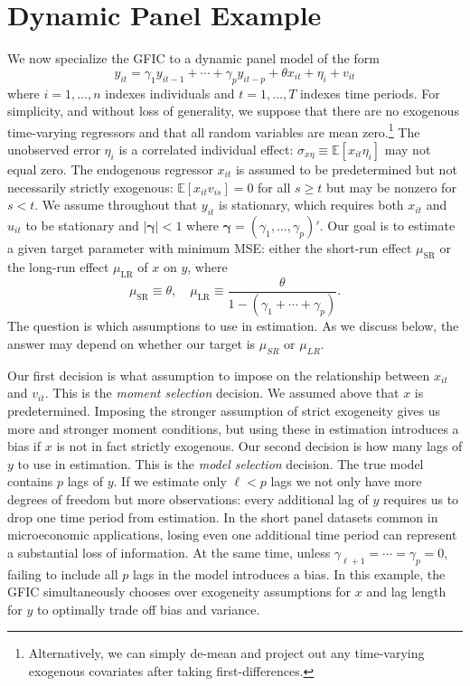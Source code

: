 \section{Dynamic Panel Example}
\label{sec:panel}
We now specialize the GFIC to a dynamic panel model of the form 
\begin{equation}
  y_{it} = \gamma_1 y_{it-1} + \cdots + \gamma_p y_{it-p} + \theta x_{it} + \eta_i + v_{it}
  \label{eq:truepanel}
\end{equation}
where $i = 1, \hdots, n$ indexes individuals and $t=1, \hdots, T$  indexes time periods. 
For simplicity, and without loss of generality, we suppose that there are no exogenous time-varying regressors and that all random variables are mean zero.\footnote{Alternatively, we can simply de-mean and project out any time-varying exogenous covariates after taking first-differences.} 
The unobserved error $\eta_i$ is a correlated individual effect: $\sigma_{x\eta}\equiv \mathbb{E}\left[ x_{it}\eta_i \right]$ may not equal zero. 
The endogenous regressor $x_{it}$ is assumed to be predetermined but not necessarily strictly exogenous: $\mathbb{E}[x_{it} v_{is}]=0$ for all $s \geq t$ but may be nonzero for $s < t$.  
We assume throughout that $y_{it}$ is stationary, which requires both $x_{it}$ and $u_{it}$ to be stationary and $|\boldsymbol{\gamma}| < 1$ where $\boldsymbol{\gamma} = (\gamma_1, \dots, \gamma_p)'$.
Our goal is to estimate a given target parameter with minimum MSE: either the short-run effect $\mu_{\text{SR}}$ or the long-run effect $\mu_{\text{LR}}$ of $x$ on $y$, where 
\begin{equation}
  \mu_{\text{SR}} \equiv \theta, \quad \mu_{\text{LR}} \equiv \frac{\theta}{1- (\gamma_1 + \cdots + \gamma_p)}.
  \label{eq:paneltarget}
\end{equation}
The question is which assumptions to use in estimation.
As we discuss below, the answer may depend on whether our target is $\mu_{SR}$ or $\mu_{LR}$.

Our first decision is what assumption to impose on the relationship between $x_{it}$ and $v_{it}$.
This is the \emph{moment selection} decision.
We assumed above that $x$ is predetermined.
Imposing the stronger assumption of strict exogeneity gives us more and stronger moment conditions, but using these in estimation introduces a bias if $x$ is not in fact strictly exogenous.
Our second decision is how many lags of $y$ to use in estimation.
This is the \emph{model selection} decision.
The true model contains $p$ lags of $y$.
If we estimate only $\ell < p$ lags we not only have more degrees of freedom but more observations: every additional lag of $y$ requires us to drop one time period from estimation. 
In the short panel datasets common in microeconomic applications, losing even one additional time period can represent a substantial loss of information.
At the same time, unless $\gamma_{\ell+1} = \cdots = \gamma_p = 0$, failing to include all $p$ lags in the model introduces a bias.
In this example, the GFIC simultaneously chooses over exogeneity assumptions for $x$ and lag length for $y$ to optimally trade off bias and variance.

